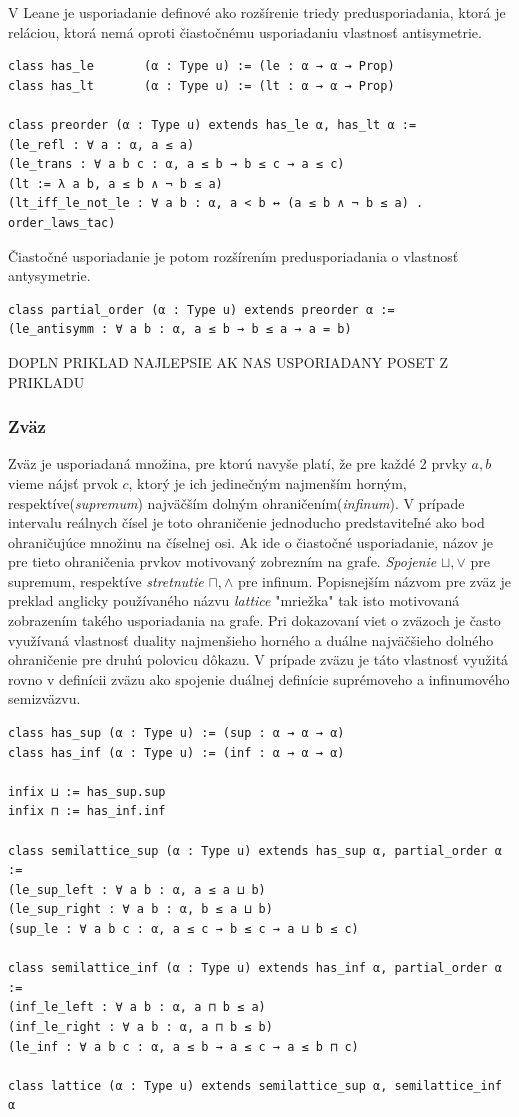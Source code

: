 \documentclass[a4paper,10pt,oneside]{report}%
\begin{document}
    V Leane je usporiadanie definové ako rozšírenie triedy predusporiadania, ktorá
je reláciou, ktorá nemá oproti čiastočnému usporiadaniu vlastnosť antisymetrie.

\begin{lstlisting}
class has_le       (α : Type u) := (le : α → α → Prop)
class has_lt       (α : Type u) := (lt : α → α → Prop)

class preorder (α : Type u) extends has_le α, has_lt α :=
(le_refl : ∀ a : α, a ≤ a)
(le_trans : ∀ a b c : α, a ≤ b → b ≤ c → a ≤ c)
(lt := λ a b, a ≤ b ∧ ¬ b ≤ a)
(lt_iff_le_not_le : ∀ a b : α, a < b ↔ (a ≤ b ∧ ¬ b ≤ a) . order_laws_tac)
\end{lstlisting}
Čiastočné usporiadanie je potom rozšírením predusporiadania o vlastnosť antysymetrie.
\begin{lstlisting}
class partial_order (α : Type u) extends preorder α :=
(le_antisymm : ∀ a b : α, a ≤ b → b ≤ a → a = b)
\end{lstlisting}

DOPLN PRIKLAD NAJLEPSIE AK NAS USPORIADANY POSET Z PRIKLADU

\subsubsection{Zväz}
    Zväz je usporiadaná množina, pre ktorú navyše platí, že pre každé 2 prvky $a, b$
vieme nájsť prvok $c$, ktorý je ich jedinečným najmenším horným, respektíve(\emph{supremum})
najväčším dolným ohraničením(\emph{infinum}).
    V prípade intervalu reálnych čísel je toto ohraničenie jednoducho predstaviteľné
ako bod ohraničujúce množinu na číselnej osi.
    Ak ide o čiastočné usporiadanie, názov je pre tieto ohraničenia prvkov
motivovaný zobrezním na grafe.
    \emph{Spojenie} $\sqcup, \vee$ pre supremum, respektíve \emph{stretnutie} $\sqcap, \wedge$ pre infinum.
    Popisnejším názvom pre zväz je preklad anglicky používaného názvu \emph{lattice}
"mriežka" tak isto motivovaná zobrazením takého usporiadania na grafe.
    Pri dokazovaní viet o zväzoch je často využívaná vlastnosť duality najmenšieho
horného a duálne najväčšieho dolného ohraničenie pre druhú polovicu dôkazu.
    V prípade zväzu je táto vlastnosť využitá rovno v definícii zväzu ako spojenie
duálnej definície suprémoveho a infinumového semizväzvu.

\begin{lstlisting}
class has_sup (α : Type u) := (sup : α → α → α)
class has_inf (α : Type u) := (inf : α → α → α)

infix ⊔ := has_sup.sup
infix ⊓ := has_inf.inf

class semilattice_sup (α : Type u) extends has_sup α, partial_order α :=
(le_sup_left : ∀ a b : α, a ≤ a ⊔ b)
(le_sup_right : ∀ a b : α, b ≤ a ⊔ b)
(sup_le : ∀ a b c : α, a ≤ c → b ≤ c → a ⊔ b ≤ c)

class semilattice_inf (α : Type u) extends has_inf α, partial_order α :=
(inf_le_left : ∀ a b : α, a ⊓ b ≤ a)
(inf_le_right : ∀ a b : α, a ⊓ b ≤ b)
(le_inf : ∀ a b c : α, a ≤ b → a ≤ c → a ≤ b ⊓ c)

class lattice (α : Type u) extends semilattice_sup α, semilattice_inf α
\end{lstlisting}
\end{document}
